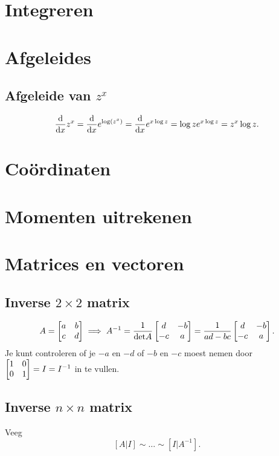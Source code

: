\documentclass{article}
\begin{document}
    \section{Integreren}\label{sec:integreren}
    

    \section{Afgeleides}\label{sec:afgeleides}
    \subsection{Afgeleide van $z^x$}\label{subsec:afgeleide-van}
    \[
        \frac{\mathop{}\!\mathrm{d}}{\mathop{}\!\mathrm{d} x} z^x = \frac{\mathop{}\!\mathrm{d}}{\mathop{}\!\mathrm{d} x} e^{\log \left( z^x \right)} = \frac{\mathop{}\!\mathrm{d}}{\mathop{}\!\mathrm{d} x} e^{x \log z} = \log z e^{x \log z} = z^x \log z.
    \]

    \section{Co\"ordinaten}\label{sec:coordinaten}
    

    \section{Momenten uitrekenen}\label{sec:momenten-uitrekenen}
    

    \section{Matrices en vectoren}\label{sec:matrices-en-vectoren}

    \subsection{Inverse $2 \times 2$ matrix}\label{subsec:inverse-2x2-matrix}
    \[
        A = \matrix{a & b \\ c & d} \implies A^{-1} = \frac{1}{\mathrm{det} A} \matrix{d & -b \\ -c & a} = \frac{1}{ad-bc} \matrix{d & -b \\ -c & a}.
    \]
    Je kunt controleren of je $-a$ en $-d$ of $-b$ en $-c$ moest nemen door $\matrix{1&0\\0&1}=I=I^{-1}$ in te vullen.

    \subsection{Inverse $n \times n$ matrix}
    Veeg
    \[
        [A|I] \sim \dots \sim [I|A^{-1}].
    \]
\end{document}
